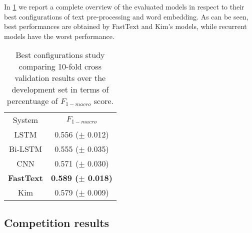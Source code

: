 In \cref{tab:overview} we report a complete overview of the evaluated models in respect to their best configurations of text pre-processing and word embedding. As can be seen, best performances are obtained by FastText and Kim's models, while recurrent models have the worst performance.
\begin{comment}
\begin{table}[h]
\footnotesize
\caption{Best configurations study comparing 10-fold cross validation results over the development set in terms of percentuage of $F_{1-macro}$ score. }
\label{tab:overviewOLD}
\centering
\begin{tabular}{c|c}
\toprule
\hline
System		& $F_{1-macro}$		\\
\hline
LSTM		& 0.556 ($\pm$ 0.012) \\
Bi-LSTM		& 0.555 ($\pm$ 0.035) \\
CNN			& 0.571 ($\pm$ 0.030) \\
\textbf{FastText}	& \textbf{0.589} ($\pm$ 0.018) \\
Kim			& 0.579 ($\pm$ 0.009) \\
\hline
\bottomrule
\end{tabular}
\end{table}
\end{comment}


\begin{table}[h]
	\centering
	\caption{Best configurations study comparing 10-fold cross validation results over the development set in terms of percentuage of $F_{1-macro}$ score. }
	\label{tab:overview}
	\begin{tabular}{c|c}
		\hline\noalign{\smallskip}
		System		& $F_{1-macro}$		\\
		\noalign{\smallskip}
		\hline
		\noalign{\smallskip}
		LSTM		& 0.556 ($\pm$ 0.012) \\
		Bi-LSTM		& 0.555 ($\pm$ 0.035) \\
		CNN			& 0.571 ($\pm$ 0.030) \\
		\textbf{FastText}	& \textbf{0.589 ($\pm$ 0.018)} \\
		Kim			& 0.579 ($\pm$ 0.009) \\
		\hline
	\end{tabular}
\end{table}


\subsection{Competition results} \label{subsec:results}

